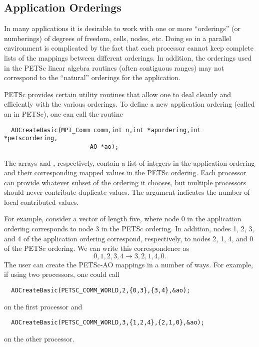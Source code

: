 \subsection{Application Orderings}
\label{sec:ao}
 

In many applications it is desirable to work with one or more
``orderings'' (or numberings) of degrees of freedom, cells, nodes,
etc.   Doing so in a parallel environment is
complicated by the fact that each processor cannot keep complete lists
of the mappings between different orderings. In addition, the
orderings used in the PETSc linear algebra routines (often contiguous 
ranges) may not correspond to the ``natural'' orderings for the application.

PETSc provides certain utility routines that allow one to deal cleanly
and efficiently with the various orderings. To define a new application ordering
(called an  in PETSc), one can call the routine 
\begin{verbatim}
  AOCreateBasic(MPI_Comm comm,int n,int *apordering,int *petscordering,
                        AO *ao);
\end{verbatim}
The  
arrays  and , respectively, contain a list of integers
in the application ordering and their corresponding mapped values in the PETSc 
ordering. Each processor can provide whatever subset of the ordering it 
chooses, but multiple processors should never contribute duplicate values. 
The argument  indicates the number of local contributed values.

For example, consider a vector of length five, where node 0 in the application ordering
corresponds to node 3 in the PETSc ordering.  In addition, nodes 1, 2, 3, and 4 of
the application ordering correspond, respectively, to nodes 2, 1, 4, and 0 of
the PETSc ordering.
We can write this correspondence as
\[
 { 0, 1, 2, 3, 4 }  \rightarrow  { 3, 2, 1, 4, 0 }. 
\]
The user can create the PETSc-AO mappings in a number of ways.  For example,
if using two processors, one could call
\begin{verbatim}
  AOCreateBasic(PETSC_COMM_WORLD,2,{0,3},{3,4},&ao);
\end{verbatim}
on the first processor and 
\begin{verbatim}
  AOCreateBasic(PETSC_COMM_WORLD,3,{1,2,4},{2,1,0},&ao);
\end{verbatim}
on the other processor.

